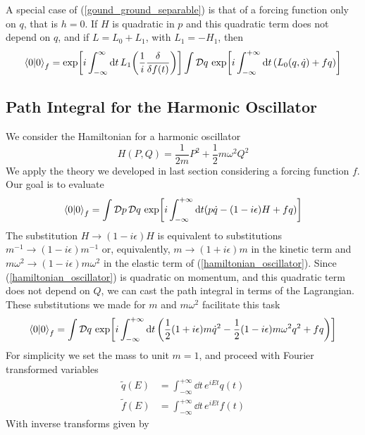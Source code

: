 A special case of (\ref{gound_ground_separable}) is that of a forcing function only on $q$, that is $h=0$. If $H$ is quadratic in $p$ and this quadratic term does not depend on $q$, and if $L=L_0+L_1$, with $L_1=-H_1$, then
\begin{equation}
    \braket{0}_{f}=\exp[i\int_{-\infty}^{\infty}\dd t\, L_1\qty(\frac{1}{i}\fdv{f(t)})]\int\mathcal{D}q\,\exp[i\int_{-\infty}^{+\infty}\dd t\, (L_0(q,\dot{q})+fq)]
\end{equation}
\subsection{Path Integral for the Harmonic Oscillator}
We consider the Hamiltonian for a harmonic oscillator
\begin{equation}
    H(P,Q)=\frac{1}{2m}P^2+\frac{1}{2}m\omega^2Q^2
    \label{hamiltonian_oscillator}
\end{equation}
We apply the theory we developed in last section considering a forcing function $f$. Our goal is to evaluate
\begin{equation}
   \braket{0}_f=\int\mathcal{D}p\,\mathcal{D}q\,\exp[i\int_{-\infty}^{+\infty}\dd t (p\dot{q}-(1-i\epsilon)H+fq)] 
\end{equation}
The substitution $H\to(1-i\epsilon)H$ is equivalent to substitutions $m^{-1}\to(1-i\epsilon)m^{-1}$ or, equivalently, $m\to(1+i\epsilon)m$ in the kinetic term and $m\omega^2\to(1-i\epsilon)m\omega^2$ in the elastic term of (\ref{hamiltonian_oscillator}).  Since (\ref{hamiltonian_oscillator}) is quadratic on momentum, and this quadratic term does not depend on $Q$, we can cast the path integral in terms of the Lagrangian. These substitutions we made for $m$  and $m\omega^2$ facilitate this task
\begin{equation}
   \braket{0}_f=\int\mathcal{D}q\,\exp[i\int_{-\infty}^{+\infty}\dd t\, \qty(\frac{1}{2}(1+i\epsilon)m\dot{q}^2-\frac{1}{2}(1-i\epsilon)m\omega^2q^2+fq)] 
   \label{ground_ground_ho}
\end{equation}
For simplicity we set the mass to unit $m=1$, and proceed with Fourier transformed variables
\begin{equation}
    \begin{aligned}
           \tilde{q}(E)&=\int_{-\infty}^{+\infty}\dd t\,e^{iEt}q(t)\\
           \tilde{f}(E)&=\int_{-\infty}^{+\infty}\dd t\,e^{iEt}f(t)
    \end{aligned}
\end{equation}
With inverse transforms given by
